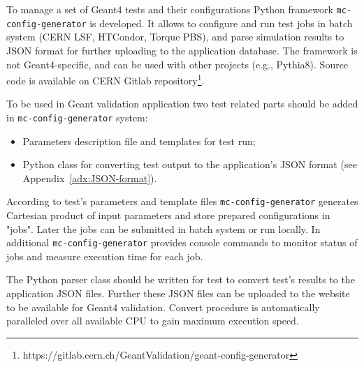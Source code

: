 To manage a set of Geant4 tests and their configurations Python framework {\tt mc-config-generator} is developed. It allows to configure and run test jobs in batch system (CERN LSF, HTCondor, Torque PBS), and parse simulation results to JSON format for further uploading to the application database.
The framework is not Geant4-specific, and can be used with other projects (e.g., Pythia8). Source code is available on
CERN Gitlab repository\footnote{https://gitlab.cern.ch/GeantValidation/geant-config-generator}.

To be used in Geant validation application two test related parts should be added in {\tt mc-config-generator} system:

\begin{itemize}
	\item Parameters description file and templates for test run;
	\item Python class for converting test output to the application's JSON format (see Appendix~\ref{adx:JSON-format}).
\end{itemize}

According to test's parameters and template files {\tt mc-config-generator} generates Cartesian product of input parameters and store prepared configurations in "jobs". Later the jobs can be submitted in batch system or run locally. In additional {\tt mc-config-generator} provides console commands to monitor status of jobs and measure execution time for each job.

The Python parser class should be written for test to convert test's results to the application JSON files. Further these JSON files can be uploaded to the website to be available for Geant4 validation.
Convert procedure is automatically paralleled over all available CPU to gain maximum execution speed.








